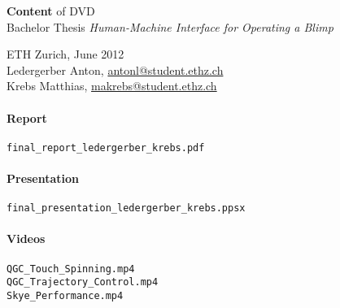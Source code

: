 \documentclass[a4paper]{article}
\begin{document}
\begin{center}

\begin{Large}
\textbf{Content} of DVD \\ Bachelor Thesis \textit{Human-Machine Interface for Operating a Blimp} \\
\end{Large}
ETH Zurich, June 2012 \\
Ledergerber Anton, \url{antonl@student.ethz.ch} \\
Krebs Matthias, \url{makrebs@student.ethz.ch}
\end{center}

\paragraph{Report}
\begin{verbatim}
final_report_ledergerber_krebs.pdf
\end{verbatim}

\paragraph{Presentation}
\begin{verbatim}
final_presentation_ledergerber_krebs.ppsx
\end{verbatim}

\paragraph{Videos}
\begin{verbatim}
QGC_Touch_Spinning.mp4
QGC_Trajectory_Control.mp4
Skye_Performance.mp4
\end{verbatim}
\end{document}
